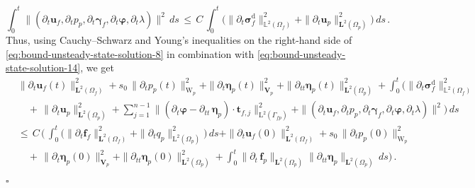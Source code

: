 \documentclass[11pt]{article}
\numberwithin{equation}{section}
\newcommand{\ds}{\displaystyle}
\newcommand{\bgamma}{{\boldsymbol\gamma}}
\newcommand{\bbeta}{{\boldsymbol\eta}}
\newcommand{\bsi}{{\boldsymbol\sigma}}
\newcommand{\bvarphi}{{\boldsymbol\varphi}}
\newcommand{\f}{\mathbf{f}}
\newcommand{\bu}{\mathbf{u}}
\newcommand{\bt}{{\mathbf{t}}}
\newcommand{\0}{{\mathbf{0}}}
\def\bV{\mathbf{V}}
\newcommand{\bL}{\mathbf{L}}
\newcommand\bbL{\mathbb{L}}
\def\L{\mathrm{L}}
\def\W{\mathrm{W}}
\def\rd{\mathrm{d}}
\newenvironment{proof}{\noindent{\it Proof.}}{\hfill$\square$}
\numberwithin{equation}{section}
\begin{document}
\begin{proof}
\begin{equation}\label{eq:bound-unsteady-state-solution-14}
\int^t_0 \|(\partial_t\bu_f, \partial_t p_p, \partial_t\bgamma_f, \partial_t\bvarphi, \partial_t\lambda)\|^2 \, ds 
\,\leq\, C\,\int^t_0 \Big( \| \partial_t\bsi^\rd_f\|^2_{\bbL^2(\Omega_f)} + \|\partial_t\bu_p\|^2_{\bL^2(\Omega_p)} \Big)\,ds \,.
\end{equation}
Thus, using Cauchy--Schwarz and Young's inequalities on the right-hand side of \eqref{eq:bound-unsteady-state-solution-8} in combination with \eqref{eq:bound-unsteady-state-solution-14}, we get
\begin{align}\label{eq:bound-unsteady-state-solution-10}
&\ds \|\partial_t\bu_f(t)\|^2_{\bL^2(\Omega_f)} 
+ s_0\,\| \partial_t p_p(t)\|^2_{\W_p} 
+ \| \partial_t \bbeta_p(t)\|^2_{\bV_p} 
+ \| \partial_{tt}\bbeta_p(t)\|^2_{\bL^2(\Omega_p)}
+ \int^t_0 \Big( \| \partial_t\bsi^\rd_f\|^2_{\bbL^2(\Omega_f)} 
\nonumber \\[1ex]
&\ds\quad +\, \| \partial_t\bu_p\|^2_{\bL^2(\Omega_p)} + \sum^{n-1}_{j=1} \|( \partial_t\bvarphi - \partial_{tt}\,\bbeta_p)\cdot\bt_{f,j}\|^2_{\L^2(\Gamma_{fp})} + \|(\partial_t\bu_f, \partial_t p_p, \partial_t\bgamma_f, \partial_t\bvarphi, \partial_t\lambda)\|^2 \Big)\, ds \nonumber \\[1ex]
&\ds\leq\, C\,\Bigg( \,\int^t_0 \big(   \|\partial_t\f_f\|^2_{\bL^2(\Omega_f)} 
+ \|\partial_t q_p\|^2_{\L^2(\Omega_p)}\big)\,ds
+ \| \partial_t\bu_f(0)\|^2_{\bL^2(\Omega_f)} 
+ s_0\,\|\partial_t p_p(0)\|^2_{\W_p} 
\nonumber \\[1ex]
&\ds\quad +\, \|\partial_t\bbeta_p(0)\|^2_{\bV_p}
+ \|\partial_{tt}\bbeta_p(0)\|^2_{\bL^2(\Omega_p)} 
+ \int^t_0 \|\partial_{t}\,\f_p\|_{\bL^2(\Omega_p)}\|\partial_{tt}\bbeta_p\|_{\bL^2(\Omega_p)}\, ds  \Bigg)\,.
\end{align}



\end{proof}
\end{document}
